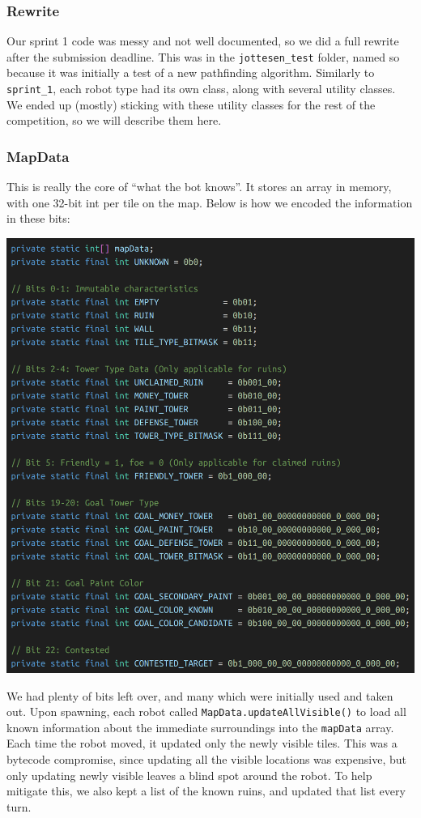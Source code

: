 \subsubsection{Rewrite}

Our sprint 1 code was messy and not well documented, so we did a full rewrite after the submission deadline. This was in the \verb|jottesen_test| folder, named so because it was initially a test of a new pathfinding algorithm. Similarly to \verb|sprint_1|, each robot type had its own class, along with several utility classes. We ended up (mostly) sticking with these utility classes for the rest of the competition, so we will describe them here.

\subsubsection{MapData}

This is really the core of ``what the bot knows''. It stores an array in memory, with one 32-bit int per tile on the map. Below is how we encoded the information in these bits:
\begin{center}
  \includegraphics[scale=0.25]{images/mapData_bits.png}
\end{center}
We had plenty of bits left over, and many which were initially used and taken out. Upon spawning, each robot called \verb|MapData.updateAllVisible()| to load all known information about the immediate surroundings into the \verb|mapData| array. Each time the robot moved, it updated only the newly visible tiles. This was a bytecode compromise, since updating all the visible locations was expensive, but only updating newly visible leaves a blind spot around the robot. To help mitigate this, we also kept a list of the known ruins, and updated that list every turn.

